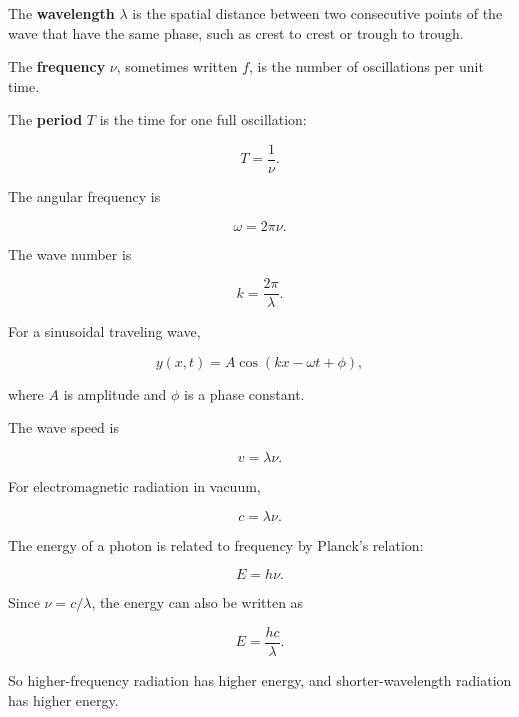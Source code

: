 \documentclass[12pt]{article}
\begin{document}
The \textbf{wavelength} $\lambda$ is the spatial distance between two consecutive points of the wave that have the same phase, such as crest to crest or trough to trough.

The \textbf{frequency} $\nu$, sometimes written $f$, is the number of oscillations per unit time.

The \textbf{period} $T$ is the time for one full oscillation:

\begin{equation}
T=\frac{1}{\nu}.
\end{equation}

The angular frequency is

\begin{equation}
\omega=2\pi\nu.
\end{equation}

The wave number is

\begin{equation}
k=\frac{2\pi}{\lambda}.
\end{equation}

For a sinusoidal traveling wave,

\begin{equation}
y(x,t)=A\cos(kx-\omega t+\phi),
\end{equation}

where $A$ is amplitude and $\phi$ is a phase constant.

The wave speed is

\begin{equation}
v=\lambda\nu.
\end{equation}

For electromagnetic radiation in vacuum,

\begin{equation}
c=\lambda\nu.
\end{equation}

The energy of a photon is related to frequency by Planck's relation:

\begin{equation}
E=h\nu.
\end{equation}

Since $\nu=c/\lambda$, the energy can also be written as

\begin{equation}
E=\frac{hc}{\lambda}.
\end{equation}

So higher-frequency radiation has higher energy, and shorter-wavelength radiation has higher energy.
\end{document}
